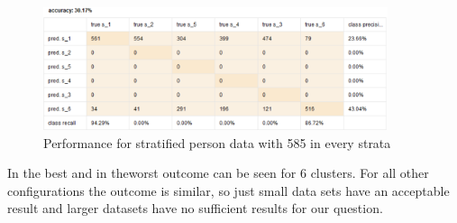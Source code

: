 \begin{figure}[H]
\includegraphics[width= 0.9\textwidth]{decvec585pre.PNG}
\caption{Performance for stratified person data with 585 in every strata}
\label{fig:DecVec585}
\end{figure}


In  the best and in  theworst outcome can be seen for 6 clusters. For all other configurations the outcome is similar, so just small data sets have an acceptable result and larger datasets have no sufficient results for our question.\\